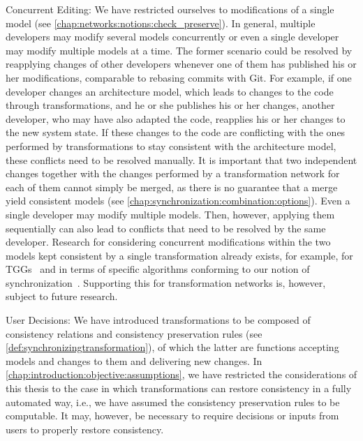 \begin{properdescription}
\item[Concurrent Editing:] 
We have restricted ourselves to modifications of a single model (see \autoref{chap:networks:notions:check_preserve}). 
In general, multiple developers may modify several models concurrently or even a single developer may modify multiple models at a time.
The former scenario could be resolved by reapplying changes of other developers whenever one of them has published his or her modifications, comparable to rebasing commits with Git.
For example, if one developer changes an architecture model, which leads to changes to the code through transformations, and he or she publishes his or her changes, another developer, who may have also adapted the code, reapplies his or her changes to the new system state.
If these changes to the code are conflicting with the ones performed by transformations to stay consistent with the architecture model, these conflicts need to be resolved manually.
It is important that two independent changes together with the changes performed by a transformation network for each of them cannot simply be merged, as there is no guarantee that a merge yield consistent models (see \autoref{chap:synchronization:combination:options}).
Even a single developer may modify multiple models. Then, however, applying them sequentially can also lead to conflicts that need to be resolved by the same developer.
Research for considering concurrent modifications within the two models kept consistent by a single transformation already exists, for example, for \glspl{TGG}~\cite{hermann2012concurrentSynchronization-FASE,orejas2020IncrementalConcurrentSynchronization-FASE} and in terms of specific algorithms conforming to our notion of synchronization~\cite{xiong2013SynchronizingConcurrentUpdates-SoSym,xiong2009parallelUpdates-ICMT}.
Supporting this for transformation networks is, however, subject to future research.
\item[User Decisions:]
We have introduced transformations to be composed of consistency relations and consistency preservation rules (see \autoref{def:synchronizingtransformation}), of which the latter are functions accepting models and changes to them and delivering new changes.
In \autoref{chap:introduction:objective:assumptions}, we have restricted the considerations of this thesis to the case in which transformations can restore consistency in a fully automated way, i.e., we have assumed the consistency preservation rules to be computable.
It may, however, be necessary to require decisions or inputs from users to properly restore consistency.

\end{properdescription}
